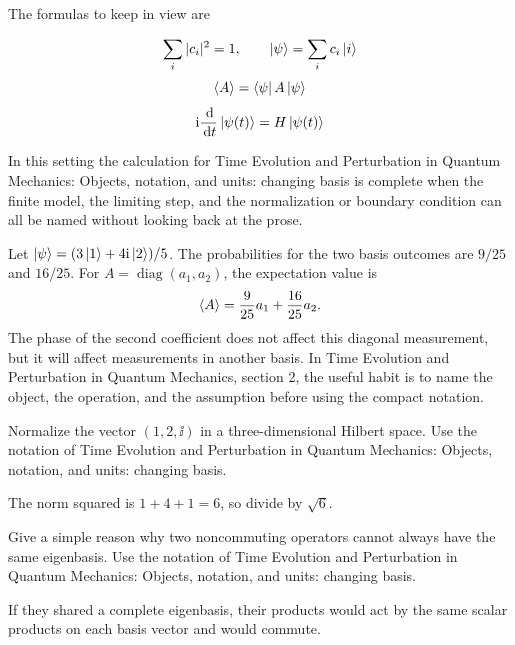 The formulas to keep in view are

\[
  \sum_i |c_i|^2=1,\qquad \left|\psi\right\rangle=\sum_i c_i\left|i\right\rangle
\]
\[
  \left\langle A\right\rangle=\left\langle \psi\right|A\left|\psi\right\rangle
\]
\[
  \mathrm i\frac{\,\mathrm d}{\,\mathrm d t}\left|\psi(t)\right\rangle=H\left|\psi(t)\right\rangle
\]

In this setting the calculation for Time Evolution and Perturbation in Quantum Mechanics: Objects, notation, and units: changing basis is complete when the finite model, the limiting step, and the normalization or boundary condition can all be named without looking back at the prose.




\begin{example}
Let \(\left|\psi\right\rangle=(3\left|1\right\rangle+4\mathrm i\left|2\right\rangle)/5\).  The probabilities for the two basis outcomes are \(9/25\) and \(16/25\).  For \(A=\operatorname{diag}(a_1,a_2)\), the expectation value is
\[
  \left\langle A\right\rangle=\frac{9}{25}a_1+\frac{16}{25}a_2.
\]
The phase of the second coefficient does not affect this diagonal measurement, but it will affect measurements in another basis.  In Time Evolution and Perturbation in Quantum Mechanics, section 2, the useful habit is to name the object, the operation, and the assumption before using the compact notation.
\end{example}



\begin{exercise}
Normalize the vector \((1,2,\ii)\) in a three-dimensional Hilbert space.  Use the notation of Time Evolution and Perturbation in Quantum Mechanics: Objects, notation, and units: changing basis.
\begin{answer}
The norm squared is \(1+4+1=6\), so divide by \(\sqrt6\).
\end{answer}
\end{exercise}

\begin{exercise}
Give a simple reason why two noncommuting operators cannot always have the same eigenbasis.  Use the notation of Time Evolution and Perturbation in Quantum Mechanics: Objects, notation, and units: changing basis.
\begin{answer}
If they shared a complete eigenbasis, their products would act by the same scalar products on each basis vector and would commute.
\end{answer}
\end{exercise}



